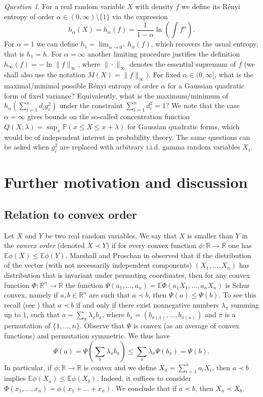 \documentclass[11pt]{amsart}
\newcommand{\mb}[1]{\mathbb{{#1}}}
\newcommand{\1}{\mathbf{1}}
\newcommand{\R}{\mathbb{R}}
\newcommand{\E}{\mathbb{E}}
\theoremstyle{definition}
\theoremstyle{definition}
\theoremstyle{remark}
\newtheorem{question}{Question}
\begin{document}
\begin{question}\label{que:renyi-entropy}
For a real random variable $X$ with density $f$ we define its R\'enyi entropy of order $\alpha \in (0,\infty) \setminus \{1\}$ via the expression
\[
	h_\alpha(X) = h_\alpha(f) = \frac{1}{1-\alpha} \ln \left( \int f^\alpha \right).
\]
For $\alpha=1$ we can define $h_1 = \lim_{\alpha \to 0^+} h_\alpha(f)$, which recovers the usual entropy, that is $h_1=h$. For $\alpha=\infty$ another limiting procedure justifies the definition $h_\infty(f) = - \ln \|f\|_\infty$, where $\|\cdot \|_\infty$ denotes the essential supremum of $f$ (we shall also use the notation $M(X)=\|f\|_\infty$). For fixed $\alpha \in (0,\infty]$, what is the maximal/minimal possible R\'enyi entropy of order $\alpha$ for a Gaussian quadratic form of  fixed variance? Equivalently, what is the maximum/minimum of $h_\alpha(\sum_{i=1}^n d_i g_i^2)$ under the constraint $\sum_{i=1}^n d_i^2 =1$? We note that the case $\alpha=\infty$ gives bounds on the so-called concentration function $Q(X; \lambda) = \sup_x \mb{P}(x \leq X \leq x+\lambda)$ for Gaussian quadratic forms, which would be of independent interest in probability theory. The same questions can be asked when $g_i^2$ are replaced with arbitrary i.i.d. gamma random variables $X_i$.
\end{question}

\section{Further motivation and discussion} \label{sec:diss}


\subsection{Relation to convex order} Let $X$ and $Y$ be two real random variables. We say that $X$ is smaller than $Y$ in the \textit{convex order} (denoted $X \prec Y$) if for every convex function $\phi:\R \to \R$ one has $\E \phi(X) \leq \E \phi(Y)$. Marshall and Proschan  in \cite{MP65} observed that if the distribution of the vector (with not necessarily independent components) $(X_1,\ldots, X_n)$ has distribution that is invariant under permuting coordinates, then for any convex function $\Phi:\R^n \to \R$ the function $\Psi(a_1,\ldots, a_n) = \E \Phi(a_1X_1,\ldots, a_n X_n)$ is Schur convex, namely if $a,b \in \R^n$ are such that $a \prec b$, then $\Psi(a)\leq \Psi(b)$. To see this recall (see \cite{MOA11}) that $a \prec b$ if and only if there exist nonnegative numbers $\lambda_\pi$ summing up to $1$, such that $a = \sum_{\pi} \lambda_\pi b_\pi$, where $b_{\pi}= (b_{\pi(1)},\ldots, b_{\pi(n)})$ and $\pi$ is a permutation of $\{1,\ldots, n\}$. Observe that $\Psi$ is convex (as an average of convex functions) and permutation symmetric. We thus have
\[
	\Psi(a) = \Psi\left(\sum_\pi \lambda_\pi b_\pi \right) \leq  \sum_\pi \lambda_\pi \Psi\left( b_\pi \right) = \Psi(b).
\]     
In particular, if $\phi:\R \to \R$ is convex and we define $X_a = \sum_{i=1}^n a_i X_i$, then $a \prec b$ implies $\E \phi(X_a) \leq \E \phi(X_b)$.
Indeed, it suffices to consider $\Phi(x_1,\ldots,x_n)= \phi(x_1+\ldots+x_n)$. We conclude that if $a \prec b$, then $X_a \prec X_b$. 
\end{document}
